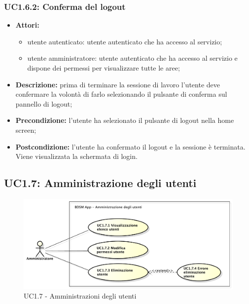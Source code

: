 \subsubsection{UC1.6.2: Conferma del logout}

\begin{itemize}
   	\item \textbf{Attori:}
    \begin{itemize}
    	\item utente autenticato: utente autenticato che ha accesso al servizio;
    	\item utente amministratore: utente autenticato che ha accesso al servizio e dispone dei permessi per visualizzare tutte le aree;
	\end{itemize}
    \item \textbf{Descrizione:} prima di terminare la sessione di lavoro l'utente deve confermare la volontà di farlo selezionando il pulsante di conferma sul pannello di logout;
    \item \textbf{Precondizione:} l'utente ha selezionato il pulsante di logout nella home screen;
    \item \textbf{Postcondizione:} l'utente ha confermato il logout e la sessione è terminata. Viene visualizzata la schermata di login.
\end{itemize}

\pagebreak


\subsection{UC1.7: Amministrazione degli utenti}

\begin{figure}[!htbp]
    \centering
    \centerline{\includegraphics[scale=0.45]{./images/UC1_7.pdf}}
    \caption{UC1.7 - Amministrazioni degli utenti}
\end{figure}


